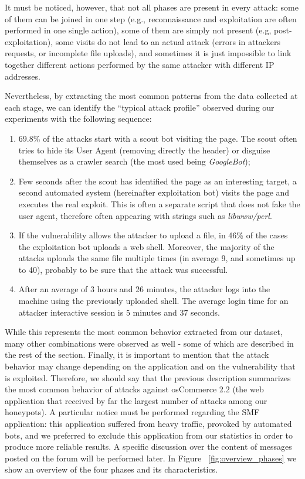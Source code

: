 It must be noticed, however, that not all phases are present in every attack: some of them can be joined in one step (e.g., reconnaissance and exploitation are often performed in one single action), some of them are simply not present (e.g, post-exploitation), some visits do not lead to an actual attack (errors in attackers requests, or incomplete file uploads), and sometimes it is just impossible to link together different actions performed by the same attacker with different IP addresses.

Nevertheless, by extracting the most common patterns from the data collected at each stage, we can identify the ``typical attack profile'' observed during our experiments with the following sequence:

\begin{enumerate}
\item
69.8\% of the attacks start with a scout bot visiting the page. The scout often tries to hide its User Agent (removing directly the header) or disguise themselves as a crawler search (the most used being \emph{GoogleBot});
\item
Few seconds after the scout has identified the page as an interesting target, a second automated system (hereinafter exploitation bot) visits the page and executes the real exploit. This is often a separate script that does not fake the user agent, therefore often appearing with strings such as \emph{libwww/perl}.
\item
If the vulnerability allows the attacker to upload a file, in 46\% of the cases the exploitation bot uploads a web shell. Moreover, the majority of the attacks uploads the same file multiple times (in average 9, and sometimes up to 40), probably to be sure that the attack was successful.
\item
After an average of 3 hours and 26 minutes, the attacker logs into the machine using the previously uploaded shell. The average login time for an attacker interactive session is 5 minutes and 37 seconds.
\end{enumerate}

While this represents the most common behavior extracted from our dataset, many other combinations were observed as well - some of which are described in the rest of the section. Finally, it is important to mention that the attack behavior may change depending on the application and on the vulnerability that is exploited. Therefore, we should say that the previous description summarizes the most common behavior of attacks against osCommerce 2.2 (the web application that received by far the largest number of attacks among our honeypots). A particular notice must be performed regarding the SMF application: this application suffered from heavy traffic, provoked by automated bots, and we preferred to exclude this application from our statistics in order to produce more reliable results. A specific discussion over the content of messages posted on the forum will be performed later. In Figure ~\ref{fig:overview_phases} we show an overview of the four phases and its characteristics.

